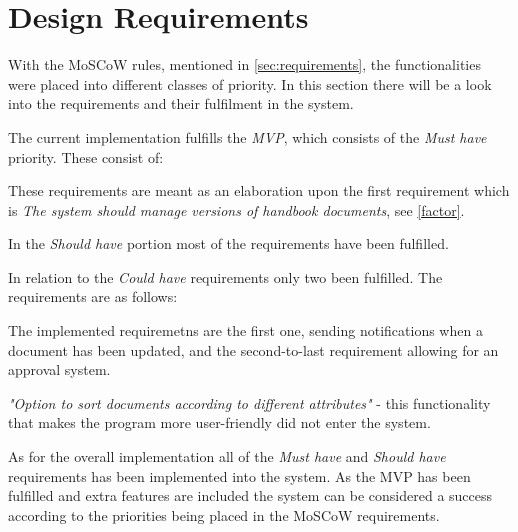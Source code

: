 \section{Design Requirements}\label{sec:disdesignrequirements}
With the MoSCoW rules, mentioned in \cref{sec:requirements}, the functionalities were placed into different classes of priority.
In this section there will be a look into the requirements and their fulfilment in the system.

The current implementation fulfills the \textit{MVP}, which consists of the \textit{Must have} priority.
These consist of:


These requirements are meant as an elaboration upon the first requirement which is \textit{The system should manage versions of handbook documents}, see \cref{factor}.

In the \textit{Should have} portion most of the requirements have been fulfilled.



In relation to the \textit{Could have} requirements only two been fulfilled.
The requirements are as follows:



The implemented requiremetns are the first one, sending notifications when a document has been updated, and the second-to-last requirement allowing for an approval system.

\textit{"Option to sort documents according to different attributes"} - this functionality that makes the program more user-friendly did not enter the system.

As for the overall implementation all of the \textit{Must have} and \textit{Should have} requirements has been implemented into the system.
As the MVP has been fulfilled and extra features are included the system can be considered a success according to the priorities being placed in the MoSCoW requirements.

